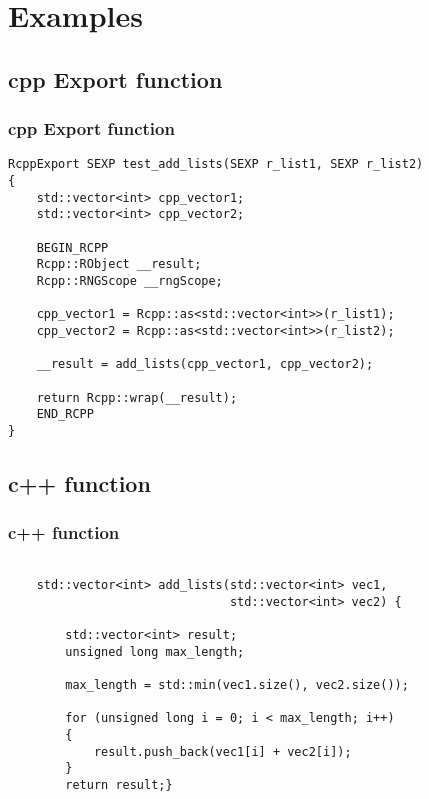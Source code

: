 \documentclass[hyperef={
    colorlinks=true,
    linkcolor=blue,
    filecolor=black,
urlcolor=blue}
]{beamer}
\begin{document}
\section{Examples}
\subsection{cpp Export function}
\begin{frame}[fragile]
\frametitle{cpp Export function}
\begin{verbatim}
RcppExport SEXP test_add_lists(SEXP r_list1, SEXP r_list2)
{        
    std::vector<int> cpp_vector1;
    std::vector<int> cpp_vector2;
        
    BEGIN_RCPP 
    Rcpp::RObject __result;
    Rcpp::RNGScope __rngScope;

    cpp_vector1 = Rcpp::as<std::vector<int>>(r_list1);
    cpp_vector2 = Rcpp::as<std::vector<int>>(r_list2);
    
    __result = add_lists(cpp_vector1, cpp_vector2);
    
    return Rcpp::wrap(__result);
    END_RCPP
}
\end{verbatim}
\end{frame}

\subsection{c++ function}
\begin{frame}[fragile]
\frametitle{c++ function}
\begin{verbatim}

    std::vector<int> add_lists(std::vector<int> vec1,
                               std::vector<int> vec2) {
        
        std::vector<int> result;
        unsigned long max_length;
        
        max_length = std::min(vec1.size(), vec2.size());
        
        for (unsigned long i = 0; i < max_length; i++)
        {
            result.push_back(vec1[i] + vec2[i]);
        }
        return result;}

\end{verbatim} 
\end{frame}
\end{document}
